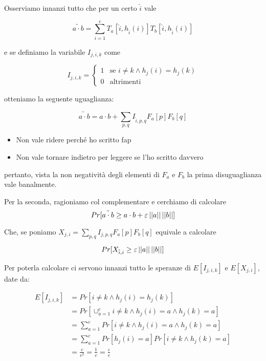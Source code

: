 \begin{proof*}
Osserviamo innanzi tutto che per un certo $\hat{i}$ vale

\[
    \tilde{a \cdot b} = \sum_{i=1}^c T_a[\hat{i}, h_{\hat{i}}(i)] T_b[\hat{i}, h_{\hat{i}}(i)]
\]

e se definiamo la variabile $I_{j, i, k}$ come

\[
    I_{j, i, k} =
    \begin{cases}
        1 & \mbox{se } i \neq k \land h_j(i) = h_j(k) \\
        0 & \mbox{altrimenti}
    \end{cases}
\]

otteniamo la seguente uguaglianza:

\[
    \tilde{a \cdot b} = a \cdot b + \sum_{p, q} I_{\hat{i}, p, q} F_a[p] F_b[q]
\]

\begin{itemize}
\item Non vale ridere perché ho scritto fap
\item Non vale tornare indietro per leggere se l'ho scritto davvero
\end{itemize}

pertanto, vista la non negatività degli elementi di $F_a$ e $F_b$ la prima
disuguaglianza vale banalmente.

Per la seconda, ragioniamo col complementare e cerchiamo di calcolare
\[ Pr[\tilde{a \cdot b} \ge a \cdot b + \varepsilon \left|\left|a\right|\right|\left|\left|b\right|\right|] \]

Che, se poniamo $X_{j, i} = \sum_{p, q} I_{j, p, q} F_a[p] F_b[q]$ equivale a calcolare

\[ Pr[X_{\hat{i}, i} \ge \varepsilon \left|\left|a\right|\right|\left|\left|b\right|\right|] \]

Per poterla calcolare ci servono innanzi tutto le speranze di $E[I_{j, i, k}]$
e $E[X_{j,i}]$, date da:

\begin{align}
    E[I_{j, i, k}] &= Pr\left[i \neq k \land h_j(i) = h_j(k)\right] \nonumber \\
    &= Pr\left[\cup_{a=1}^c i \neq k \land h_j(i) = a \land h_j(k) = a \right] \nonumber \\
    &= \sum_{a=1}^c Pr\left[i \neq k \land h_j(i) = a \land h_j(k) = a \right] \nonumber \\
    &= \sum_{a=1}^c Pr\left[h_j(i) = a\right]Pr\left[i \neq k \land h_j(k) = a \right] \nonumber \\
    &= \frac{c}{c^2} = \frac{1}{c} = \frac{\varepsilon}{e} \nonumber
\end{align}


\end{proof*}
